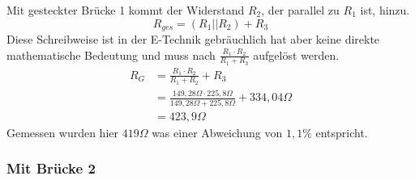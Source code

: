\documentclass[
a4paper,     %
 headsepline, %
11pt         %
]{scrartcl}  %
\begin{document}
Mit gesteckter Brücke 1 kommt der Widerstand $R_2$, der parallel zu $R_1$ ist, hinzu. 
\[R_{ges}=(R_1 || R_2)+R_3 \]
Diese Schreibweise ist in der E-Technik gebräuchlich hat aber keine direkte mathematische Bedeutung und muss nach $\frac{R_1 \cdot R_2}{R_1+R_3}$ aufgelöst werden.
\begin{align}
R_G &= \frac{R_1 \cdot R_2}{R_1+R_2} + R_3 \nonumber \\ 
	&= \frac{149,28\Omega \cdot 225,8 \Omega}{149,28\Omega + 225,8 \Omega} + 334,04 \Omega \nonumber \\
	&= 423,9 \Omega \nonumber 
\end{align}
Gemessen wurden hier $419 \Omega$ was einer Abweichung von $1,1\%$ entspricht.

\subsubsection{Mit Brücke 2}
\end{document}
